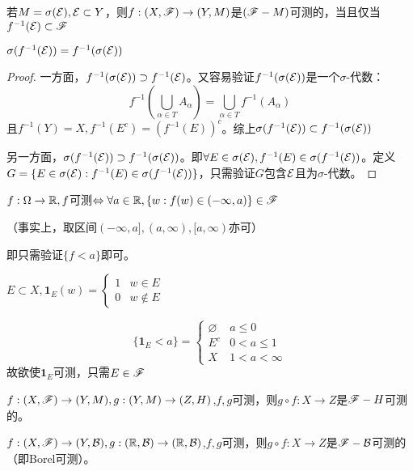 \documentclass{ctexart}
\begin{document}
\begin{Prop}\label{nosig}
  若$M=\sigma(\mathcal{E}),\mathcal{E}\subset Y$，则$f:(X,\mathscr{F})\to (Y,M)$是$(\mathscr{F}-M)$可测的，当且仅当$f^{-1}(\mathcal{E})\subset \mathscr{F}$
\end{Prop}
\begin{Prop}
  $\sigma(f^{-1}(\mathcal{E}))=f^{-1}(\sigma(\mathcal{E}))$
\end{Prop}
\begin{proof}
  一方面，$f^{-1}(\sigma(\mathcal{E}))\supset f^{-1}(\mathcal{E})$。又容易验证$f^{-1}(\sigma(\mathcal{E}))$是一个$\sigma$-代数：
  \[f^{-1}(\bigcup_{\alpha\in T} A_{\alpha})=\bigcup_{\alpha\in T}f^{-1}(A_{\alpha})\]
  且$f^{-1}(Y)=X, f^{-1}(E^{c})=(f^{-1}(E))^{c}$。综上$\sigma(f^{-1}(\mathcal{E}))\subset f^{-1}(\sigma(\mathcal{E}))$

  另一方面，$\sigma(f^{-1}(\mathcal{E}))\supset f^{-1}(\sigma(\mathcal{E}))$。即$\forall E\in\sigma(\mathcal{E}), f^{-1}(E)\in\sigma(f^{-1}(\mathcal{E}))$。定义$G=\{E\in\sigma(\mathcal{E}):f^{-1}(E)\in \sigma(f^{-1}(\mathcal{E}))\}$，只需验证$G$包含$\mathcal{E}$且为$\sigma$-代数。
\end{proof}

\begin{Cor}
  $f:\Omega\to\mathbb{R}, f$可测$\Leftrightarrow\forall a\in\mathbb{R}, \{w:f(w)\in(-\infty,a)\}\in\mathscr{F}$

  （事实上，取区间$(-\infty,a],(a,\infty),[a,\infty)$亦可）
\end{Cor}

即只需验证$\{f<a\}$即可。

\begin{Eg}[指示函数]
  $E\subset X, \bm{1}_{E}(w)=
  \begin{cases}
    1&w\in E\\0 &w\not\in E
  \end{cases}
  $

  \[\{\bm{1}_{E}<a\}=
    \begin{cases}
      \varnothing&a\leq 0\\E^{c} &0<a\leq 1\\X&1<a<\infty
    \end{cases}
  \]
  故欲使$\bm{1}_{E}$可测，只需$E\in\mathscr{F}$
\end{Eg}

\begin{Eg}
  $f:(X,\mathscr{F})\to (Y,M),g:(Y,M)\to (Z,H)$,$f,g$可测，则$g\circ f:X\to Z$是$\mathscr{F}-H$可测的。
\end{Eg}

\begin{Eg}
  $f:(X,\mathscr{F})\to (Y,\mathcal{B}),g:(\mathbb{R},\mathcal{B})\to (\mathbb{R},\mathcal{B})$,$f,g$可测，则$g\circ f:X\to Z$是$\mathscr{F}-\mathcal{B}$可测的（即Borel可测）。
\end{Eg}
\end{document}
